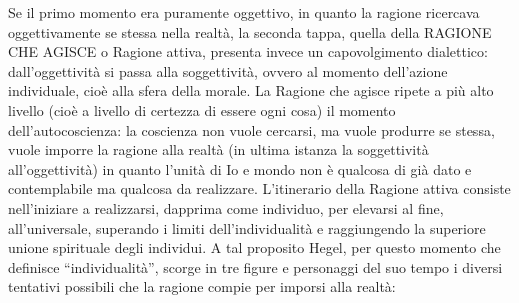 \documentclass[a4paper,12pt,oneside,openany]{book}%
\begin{document}
Se il primo momento era puramente oggettivo, in quanto la ragione ricercava oggettivamente se stessa nella realtà, la seconda tappa, quella della RAGIONE CHE AGISCE o Ragione attiva, presenta invece un capovolgimento dialettico: dall’oggettività si passa alla soggettività, ovvero al momento dell’azione individuale, cioè alla sfera della morale. La Ragione che agisce ripete a più alto livello (cioè a livello di certezza di essere ogni cosa) il momento dell’autocoscienza: la coscienza non vuole cercarsi, ma vuole produrre se stessa, vuole imporre la ragione alla realtà (in ultima istanza la soggettività all’oggettività) in quanto l’unità di Io e mondo non è qualcosa di già dato e contemplabile ma qualcosa da realizzare. L’itinerario della Ragione attiva consiste nell’iniziare a realizzarsi, dapprima come individuo, per elevarsi al fine, all’universale, superando i limiti dell’individualità e raggiungendo la superiore unione spirituale degli individui. A tal proposito Hegel, per questo momento che definisce “individualità”, scorge in tre figure e personaggi del suo tempo i diversi tentativi possibili che la ragione compie per imporsi alla realtà:
\end{document}
